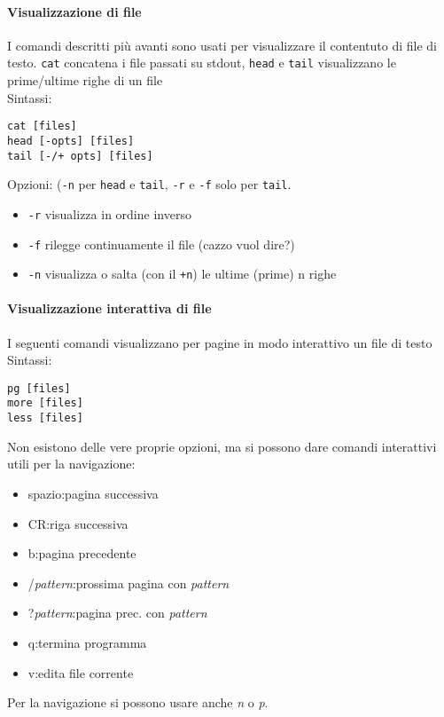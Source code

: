 \documentclass[a4paper]{article}
\begin{document}
\paragraph{Visualizzazione di file} I comandi descritti più avanti sono usati per visualizzare il contentuto di file di testo. \verb|cat| concatena i file passati su stdout, \verb|head| e \verb|tail| visualizzano le prime/ultime righe di un file \\
Sintassi:
\begin{verbatim}
cat [files]
head [-opts] [files]
tail [-/+ opts] [files]
\end{verbatim}

Opzioni: (\verb|-n| per \verb|head| e \verb|tail|, \verb|-r| e \verb|-f| solo per \verb|tail|.
\begin{itemize}
\item \verb|-r| visualizza in ordine inverso
\item \verb|-f| rilegge continuamente il file (cazzo vuol dire?)
\item \verb|-n| visualizza o salta (con il \verb|+n|) le ultime (prime) n righe
\end{itemize}

\paragraph{Visualizzazione interattiva di file}I seguenti comandi visualizzano per pagine in modo interattivo un file di testo \\
Sintassi:
\begin{verbatim}
pg [files]
more [files]
less [files]
\end{verbatim}

Non esistono delle vere proprie opzioni, ma si possono dare comandi interattivi utili per la navigazione:
\begin{itemize}
\item spazio:pagina successiva
\item CR:riga successiva
\item b:pagina precedente
\item /\textit{pattern}:prossima pagina con \textit{pattern}
\item ?\textit{pattern}:pagina prec. con \textit{pattern}
\item q:termina programma
\item v:edita file corrente
\end{itemize}
Per la navigazione si possono usare anche \textit{n} o \textit{p}.
\end{document}

